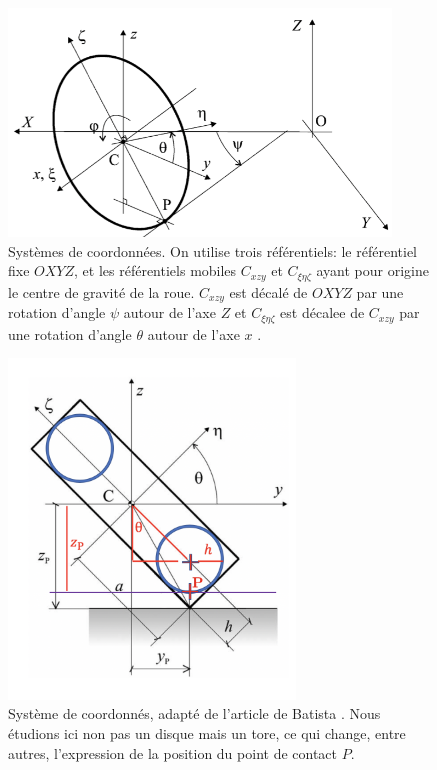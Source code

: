 \begin{figure}[htb]
\centering
\includegraphics[width=4in]{batista/ref1.png}
\caption{Systèmes de coordonnées. On utilise trois référentiels: le référentiel fixe  $OXYZ$, et les référentiels mobiles $C_{xzy}$ et $C_{\xi\eta\zeta}$ ayant pour origine le centre de gravité de la roue. $C_{xzy}$ est décalé de $OXYZ$ par une rotation d'angle $\psi$ autour de l'axe $Z$ et $C_{\xi\eta\zeta}$ est décalee de $C_{xzy}$ par une rotation d'angle $\theta$ autour de l'axe $x$ \cite{Batista}.}
\label{fig:ref1}
\end{figure}

\begin{figure}[htb]
\centering
\includegraphics[width=3in]{batista/ref2.png}
\caption{Système de coordonnés, adapté de l'article de Batista \cite{Batista}. Nous étudions ici non pas un disque mais un tore, ce qui change, entre autres, l'expression de la position du point de contact $P$.}
\label{fig:ref2}
\end{figure}

